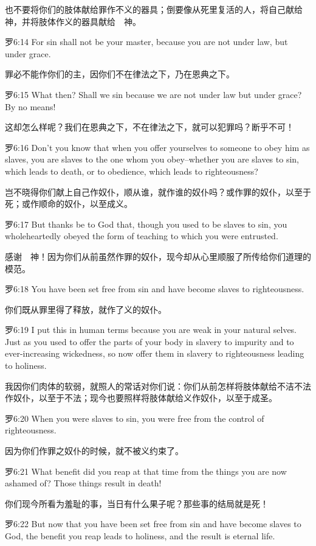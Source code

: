 \documentclass[a4paper,11pt,onecolumn,twoside]{ctexart}
\begin{document}
\begin{multicols}{2}
 也不要将你们的肢体献给罪作不义的器具；倒要像从死里复活的人，将自己献给　神，并将肢体作义的器具献给　神。


 罗6:14
 For sin shall not be your master, because you are not under law, but under grace.

 罪必不能作你们的主，因你们不在律法之下，乃在恩典之下。


 罗6:15
 What then? Shall we sin because we are not under law but under grace? By no means!

 这却怎么样呢？我们在恩典之下，不在律法之下，就可以犯罪吗？断乎不可！


 罗6:16
 Don't you know that when you offer yourselves to someone to obey him as slaves, you are slaves to the one whom you obey--whether you are slaves to sin, which leads to death, or to obedience, which leads to righteousness?

 岂不晓得你们献上自己作奴仆，顺从谁，就作谁的奴仆吗？或作罪的奴仆，以至于死；或作顺命的奴仆，以至成义。


 罗6:17
 But thanks be to God that, though you used to be slaves to sin, you wholeheartedly obeyed the form of teaching to which you were entrusted.

 感谢　神！因为你们从前虽然作罪的奴仆，现今却从心里顺服了所传给你们道理的模范。


 罗6:18
 You have been set free from sin and have become slaves to righteousness.

 你们既从罪里得了释放，就作了义的奴仆。


 罗6:19
 I put this in human terms because you are weak in your natural selves. Just as you used to offer the parts of your body in slavery to impurity and to ever-increasing wickedness, so now offer them in slavery to righteousness leading to holiness.

 我因你们肉体的软弱，就照人的常话对你们说：你们从前怎样将肢体献给不洁不法作奴仆，以至于不法；现今也要照样将肢体献给义作奴仆，以至于成圣。


 罗6:20
 When you were slaves to sin, you were free from the control of righteousness.

 因为你们作罪之奴仆的时候，就不被义约束了。


 罗6:21
 What benefit did you reap at that time from the things you are now ashamed of? Those things result in death!

 你们现今所看为羞耻的事，当日有什么果子呢？那些事的结局就是死！


 罗6:22
 But now that you have been set free from sin and have become slaves to God, the benefit you reap leads to holiness, and the result is eternal life.


\end{multicols}
\end{document}
